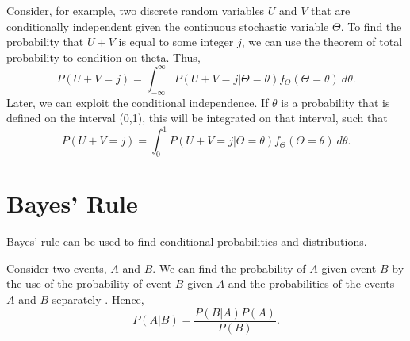 Consider, for example, two discrete random variables $U$ and $V$ that are conditionally independent given the continuous stochastic variable $\Theta$. To find the probability that $U+V$ is equal to some integer $j$, we can use the theorem of total probability to condition on theta. Thus,
\begin{equation*}
    P(U+V=j) = \int_{-\infty}^\infty P(U+V=j|\Theta=\theta)f_{\Theta}(\Theta=\theta) \: d\theta.
\end{equation*}
Later, we can exploit the conditional independence. If $\theta$ is a probability that is defined on the interval (0,1), this will be integrated on that interval, such that 
\begin{equation*}
    P(U+V=j) = \int_{0}^1 P(U+V=j|\Theta=\theta)f_{\Theta}(\Theta=\theta) \: d\theta.
\end{equation*}




\section{Bayes' Rule}
Bayes' rule can be used to find conditional probabilities and distributions. 
\begin{theorem}
Consider two events, $A$ and $B$. We can find the probability of $A$ given event $B$ by the use of the probability of event $B$ given $A$ and the probabilities of the events $A$ and $B$ separately \citep{statinf}. Hence,
\begin{equation}
\label{bayesrule}
    P(A|B)=\frac{P(B|A)P(A)}{P(B)}.
\end{equation}
\end{theorem}




\begin{comment}
From \citet{schay2016introduction}, we have a version of Bayes' theorem for continuous variables which is stated as 
\begin{theorem}[Bayes' Theorem]
\label{bayestheorem}
For a continuous random variable Y and any event A with nonzero probability, if $P(A|Y=y)$ and $f_Y$ exist for all $y$, then
\begin{equation}
    \label{bayestheorem_eq}
    f_{Y|A}(y) = \frac{P(A|Y=y)f_Y(y)}{\int_{-\infty}^{\infty}P(A|Y=y) f_Y(y) dy}.
\end{equation}
Here $f_Y$is called the prior density of $Y$, and $f_{Y|A}$ its posterior density, referring to the fact that these are the densities of $Y$ before and after the observation of $A$. 
\end{theorem}

From \eqref{lawoftotprob} we see that the denominator is the probability of event $A$, \begin{equation*}
    \int_{-\infty}^{\infty}P(A|Y=y) f_Y(y) = P(A),
\end{equation*}
such that Bayes' theorem can be stated as
\begin{equation}
    \label{bayestheorem_eq2}
    f_{Y|A}(y) = \frac{P(A|Y=y)f_Y(y)}{P(A)}.
\end{equation}


Or:
\end{comment}

